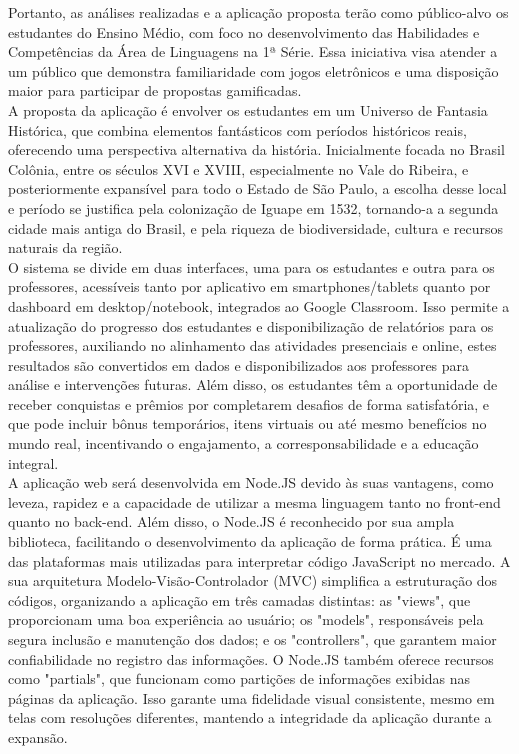 Portanto, as análises realizadas e a aplicação proposta terão como público-alvo os estudantes do Ensino Médio, com foco no desenvolvimento das Habilidades e Competências da Área de Linguagens na 1ª Série. Essa iniciativa visa atender a um público que demonstra familiaridade com jogos eletrônicos e uma disposição maior para participar de propostas gamificadas.
\\

A proposta da aplicação é envolver os estudantes em um Universo de Fantasia Histórica, que combina elementos fantásticos com períodos históricos reais, oferecendo uma perspectiva alternativa da história. Inicialmente focada no Brasil Colônia, entre os séculos XVI e XVIII, especialmente no Vale do Ribeira, e posteriormente expansível para todo o Estado de São Paulo, a escolha desse local e período se justifica pela colonização de Iguape em 1532, tornando-a a segunda cidade mais antiga do Brasil, e pela riqueza de biodiversidade, cultura e recursos naturais da região.
\\

O sistema se divide em duas interfaces, uma para os estudantes e outra para os professores, acessíveis tanto por aplicativo em smartphones/tablets quanto por dashboard em desktop/notebook, integrados ao Google Classroom. Isso permite a atualização do progresso dos estudantes e disponibilização de relatórios para os professores, auxiliando no alinhamento das atividades presenciais e online, estes resultados são convertidos em dados e disponibilizados aos professores para análise e intervenções futuras. Além disso, os estudantes têm a oportunidade de receber conquistas e prêmios por completarem desafios de forma satisfatória, e que pode incluir bônus temporários, itens virtuais ou até mesmo benefícios no mundo real, incentivando o engajamento, a corresponsabilidade e a educação integral. 
\\

A aplicação web será desenvolvida em Node.JS devido às suas vantagens, como leveza, rapidez e a capacidade de utilizar a mesma linguagem tanto no front-end quanto no back-end. Além disso, o Node.JS é reconhecido por sua ampla biblioteca, facilitando o desenvolvimento da aplicação de forma prática. É uma das plataformas mais utilizadas para interpretar código JavaScript no mercado. A sua arquitetura Modelo-Visão-Controlador (MVC) simplifica a estruturação dos códigos, organizando a aplicação em três camadas distintas: as "views", que proporcionam uma boa experiência ao usuário; os "models", responsáveis pela segura inclusão e manutenção dos dados; e os "controllers", que garantem maior confiabilidade no registro das informações. O Node.JS também oferece recursos como "partials", que funcionam como partições de informações exibidas nas páginas da aplicação. Isso garante uma fidelidade visual consistente, mesmo em telas com resoluções diferentes, mantendo a integridade da aplicação durante a expansão.
\\

